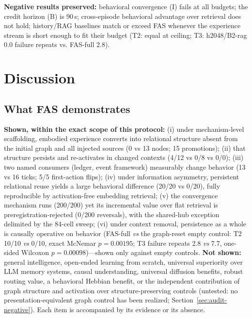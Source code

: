 \documentclass[10pt,a4paper]{article}
\begin{document}
\textbf{Negative results preserved:} behavioral convergence (I) fails
at all budgets; the credit horizon (B) is 90\,s; cross-episode
behavioral advantage over retrieval does not hold; history/RAG baselines match or exceed FAS whenever the experience stream is short enough to fit their budget (T2: equal at ceiling; T3: h2048/B2-rag 0.0 failure repeats vs. FAS-full 2.8).

\section{Discussion}
\label{sec:discussion}

\subsection{What FAS demonstrates}
\textbf{Shown, within the exact scope of this protocol:} (i) under mechanism-level scaffolding, embodied experience converts into relational structure absent from the initial graph and all injected sources (0 vs 13 nodes; 15 promotions); (ii) that structure persists and re-activates in changed contexts (4/12 vs 0/8 vs 0/0); (iii) two named consumers (ledger, event framework) measurably change behavior (13 vs 16 ticks; 5/5 first-action flips); (iv) under information asymmetry, persistent relational reuse yields a large behavioral difference (20/20 vs 0/20), fully reproducible by activation-free embedding retrieval; (v) the convergence mechanism runs (200/200) yet its incremental value over flat retrieval is preregistration-rejected (0/200 reversals), with the shared-hub exception delimited by the 84-cell sweep; (vi) under context removal, persistence as a whole is causally operative on behavior (FAS-full \emph{vs} the graph-reset empty control: T2 10/10 \emph{vs} 0/10, exact McNemar $p{=}0.00195$; T3 failure repeats 2.8 \emph{vs} 7.7, one-sided Wilcoxon $p{=}0.00098$)---shown only against empty controls. \textbf{Not shown:} general intelligence, open-ended learning from scratch, universal superiority over LLM memory systems, causal understanding, universal diffusion benefits, robust routing value, a behavioral Hebbian benefit, or the independent contribution of graph structure and activation over structure-preserving controls (untested: no presentation-equivalent graph control has been realized; Section~\ref{sec:audit-negative}). Each item is accompanied by its evidence or its absence.
\end{document}
